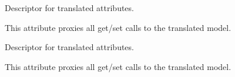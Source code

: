 \documentclass[letterpaper,10pt,french]{sphinxmanual}
\begin{document}
\begin{fulllineitems}
\begin{fulllineitems}
\label{\detokenize{index:core.models.CampingInfo.welcome_end}}
\pysigstartsignatures
\pysigline
{}
\pysigstopsignatures
\sphinxAtStartPar
Descriptor for translated attributes.

\sphinxAtStartPar
This attribute proxies all get/set calls to the translated model.

\end{fulllineitems}


\begin{fulllineitems}
\label{\detokenize{index:core.models.CampingInfo.welcome_start}}
\pysigstartsignatures
\pysigline
{}
\pysigstopsignatures
\sphinxAtStartPar
Descriptor for translated attributes.

\sphinxAtStartPar
This attribute proxies all get/set calls to the translated model.

\end{fulllineitems}


\end{fulllineitems}

\end{document}
